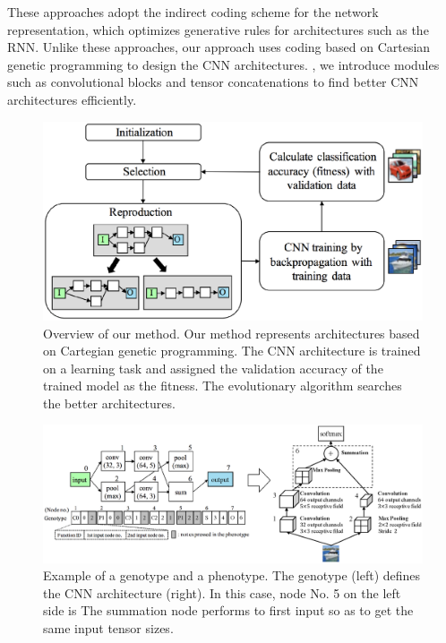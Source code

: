 These approaches adopt the indirect coding scheme for the network representation, which optimizes generative rules for  architectures such as the RNN.
Unlike these approaches, our approach uses  coding based on Cartesian genetic programming to design the CNN architectures.
, we introduce   modules\new{,} such as convolutional blocks and tensor concatenations\new{,} to find better CNN architectures efficiently.

\begin{figure}[t]
\includegraphics[width=0.99\linewidth]{images/overview.eps}
\caption{Overview of our method. Our method represents  architectures based on Cartegian genetic programming. The CNN architecture is trained on a learning task and assigned the validation accuracy of the trained model as the fitness. The evolutionary algorithm searches the better architectures.}
\label{overview}
\end{figure}

\begin{figure}[t]
\includegraphics[width=0.99\linewidth]{images/genotype.eps}
\caption{Example of a genotype and a phenotype. The genotype (left) defines the CNN architecture (right). In this case, node No. 5 on the left side is  The summation node performs  to  first input so as to get the same input tensor sizes.}
\label{genotype}
\end{figure}

